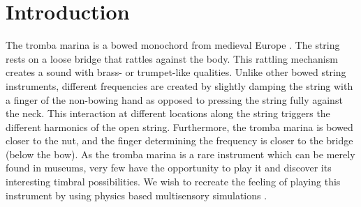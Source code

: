 \documentclass[dvipsnames, pdftex]{article}
\title{\papertitle}
\begin{document}
%
\capstartfalse
\maketitle
\capstarttrue
%
\begin{abstract}
In this paper we propose a multisensory simulation of a tromba marina - a bowed string instrument in virtual reality. The auditory feedback is generated by an accurate physical model, the haptic feedback is provided by the PHANTOM Omni, and the visual feedback is rendered through an Oculus Rift CV1 head-mounted display (HMD). Moreover, we present a user study exploring the experience of interacting with a virtual bowed string instrument, as well as evaluating the playability of the system. The study comprises of both qualitative (observations, think aloud and interviews) and quantitative (survey) data collection methods. The results indicate that the implementation was successful, offering participants realistic feedback, as well as a satisfactory multisensory experience, allowing them to use the system as a musical instrument.
\end{abstract}

\section{Introduction}\label{sec:introduction}
The tromba marina is a bowed monochord from medieval Europe \cite{encyclopaedia2020}. The string rests on a loose bridge that rattles against the body. This rattling mechanism creates a sound with brass- or trumpet-like qualities. Unlike other bowed string instruments, different frequencies are created by slightly damping the string with a finger of the non-bowing hand as opposed to pressing the string fully against the neck. This interaction at different locations along the string triggers the different harmonics of the open string. Furthermore, the tromba marina is bowed closer to the nut, and the finger determining the frequency is closer to the bridge (below the bow).
As the tromba marina is a rare instrument which can be merely found in museums, very few have the opportunity to play it and discover its interesting timbral possibilities. 
We wish to recreate the feeling of playing this instrument by using physics based  multisensory simulations \cite{pai2005multisensory}.
\end{document}
